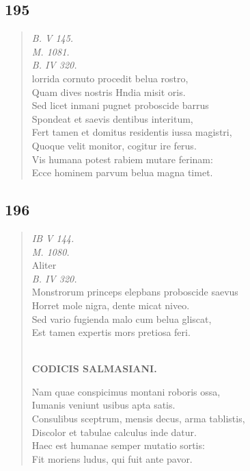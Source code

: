 \documentclass[11pt, a4paper]{report}
\begin{document}
            \subsection*{195}
      \begin{verse}
      \textit{B. V 145.} \\ \textit{M. 1081.} \\ \textit{B. IV 320.} \\ lorrida cornuto procedit belua rostro, \\ Quam dives nostris Hndia misit oris. \\ Sed licet inmani pugnet proboscide barrus \\ Spondeat et saevis dentibus interitum, \\ Fert tamen et domitus residentis iussa magistri, \\ Quoque velit monitor, cogitur ire ferus. \\ Vis humana potest rabiem mutare ferinam: \\ Ecce hominem parvum belua magna timet. \\ 
      \end{verse}
  
            \subsection*{196}
      \begin{verse}
      \textit{IB V 144.} \\ \textit{M. 1080.} \\ Aliter \\ \textit{B. IV 320.} \\ Monstrorum princeps elepbans proboscide saevus \\ Horret mole nigra, dente micat niveo. \\ Sed vario fugienda malo cum belua gliscat, \\ Est tamen expertis mors pretiosa feri. \\ 
        ﻿\pagebreak 
    \begin{center} \textbf{CODICIS SALMASIANI.} \end{center} \marginpar{[161]} Nam quae conspicimus montani roboris ossa, \\ Iumanis veniunt usibus apta satis. \\ Consulibus sceptrum, mensis decus, arma tablistis, \\ Discolor et tabulae calculus inde datur. \\ Haec est humanae semper mutatio sortis: \\ Fit moriens ludus, qui fuit ante pavor. \\ 
      \end{verse}
  
\end{document}

